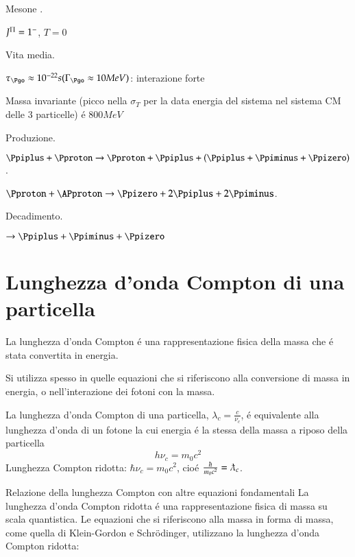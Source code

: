 \documentclass[main.tex]{subfiles}
\begin{document}
Mesone \Pgo.

\begin{itemize*}
\item $J^{\Pi}=1^-$, $T=0$
\item Vita media.

$\tau_{\Pgo}\approx10^{-22} s (\Gamma_{\Pgo}\approx10 MeV)$: interazione forte

\item Massa invariante (picco nella $\sigma_T$ per la data energia del sistema \Pgp\Pgp\Pgp nel sistema CM delle 3 particelle) \'e $800 MeV$

\item Produzione.

$\Ppiplus+\Pproton\to\Pproton+\Ppiplus+(\Ppiplus+\Ppiminus+\Ppizero)$.

$\Pproton+\APproton\to\Ppizero+2\Ppiplus+2\Ppiminus$.
\item Decadimento.

$\to\Ppiplus+\Ppiminus+\Ppizero$

\end{itemize*}

\section{Lunghezza d'onda Compton di una particella}
La lunghezza d'onda Compton \'e una rappresentazione fisica della massa che \'e stata convertita in energia.

Si utilizza spesso in quelle equazioni che si riferiscono alla conversione di massa in energia, o nell'interazione dei fotoni con la massa.

La lunghezza d'onda Compton di una particella, $\lambda_c=\frac{c}{\nu_c}$, \'e equivalente alla lunghezza d'onda di un fotone la cui energia \'e la stessa della massa a riposo della particella
\begin{equation*}
h\nu_c=m_0c^2
\end{equation*}
Lunghezza Compton ridotta: $\hbar\nu_c=m_0c^2$, cio\'e $\frac{\hbar}{m_0c^2}=\lambdabar_c$.

Relazione della lunghezza Compton con altre equazioni fondamentali
La lunghezza d'onda Compton ridotta \'e una rappresentazione fisica di massa su scala quantistica. Le equazioni che si riferiscono alla massa in forma di massa, come quella di Klein-Gordon e Schr\"odinger, utilizzano la lunghezza d'onda Compton ridotta:
\end{document}
